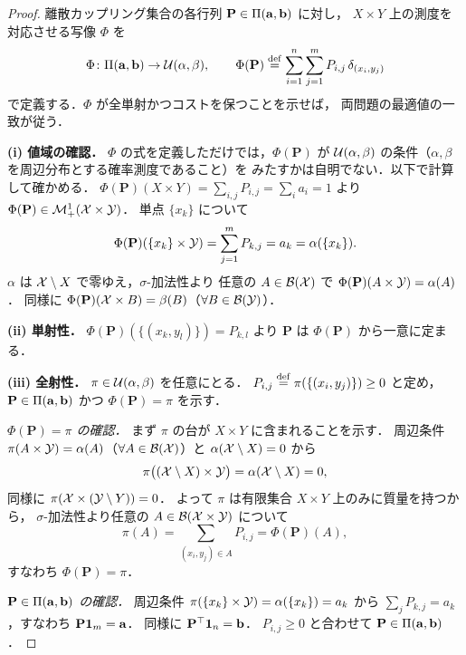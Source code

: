 \begin{proof}
  離散カップリング集合の各行列
  $\mathbf{P} \in \Pi(\mathbf{a}, \mathbf{b})$ に対し，
  $X \times Y$ 上の測度を対応させる写像 $\Phi$ を
  \[
    \Phi \colon \Pi(\mathbf{a}, \mathbf{b}) \to \mathcal{U}(\alpha, \beta),
    \qquad
    \Phi(\mathbf{P}) \overset{\mathrm{def}}{=} \sum_{i=1}^n \sum_{j=1}^m P_{i,j}\, \delta_{(x_i, y_j)}
  \]
  で定義する．$\Phi$ が全単射かつコストを保つことを示せば，
  両問題の最適値の一致が従う．

  \textbf{(i) 値域の確認．}
  $\Phi$ の式を定義しただけでは，$\Phi(\mathbf{P})$ が
  $\mathcal{U}(\alpha,\beta)$ の条件（$\alpha,\beta$ を周辺分布とする確率測度であること）を
  みたすかは自明でない．以下で計算して確かめる．
  $\Phi(\mathbf{P})(X \times Y) = \sum_{i,j} P_{i,j} = \sum_i a_i = 1$ より
  $\Phi(\mathbf{P}) \in \mathcal{M}_+^1(\mathcal{X} \times \mathcal{Y})$．
  単点 $\{x_k\}$ について
  \[
    \Phi(\mathbf{P})(\{x_k\} \times \mathcal{Y})
    = \sum_{j=1}^m P_{k,j}
    = a_k
    = \alpha(\{x_k\}).
  \]
  $\alpha$ は $\mathcal{X} \setminus X$ で零ゆえ，$\sigma$-加法性より
  任意の $A \in \mathcal{B}(\mathcal{X})$ で $\Phi(\mathbf{P})(A \times \mathcal{Y}) = \alpha(A)$．
  同様に $\Phi(\mathbf{P})(\mathcal{X} \times B) = \beta(B)$（$\forall B \in \mathcal{B}(\mathcal{Y})$）．

  \textbf{(ii) 単射性．}
  $\Phi(\mathbf{P})(\{(x_k, y_l)\}) = P_{k,l}$ より
  $\mathbf{P}$ は $\Phi(\mathbf{P})$ から一意に定まる．

  \textbf{(iii) 全射性．}
  $\pi \in \mathcal{U}(\alpha, \beta)$ を任意にとる．
  $P_{i,j} \overset{\mathrm{def}}{=} \pi(\{(x_i, y_j)\}) \geq 0$ と定め，
  $\mathbf{P} \in \Pi(\mathbf{a}, \mathbf{b})$ かつ $\Phi(\mathbf{P}) = \pi$ を示す．

  \textit{$\Phi(\mathbf{P}) = \pi$ の確認．}
  まず $\pi$ の台が $X \times Y$ に含まれることを示す．
  周辺条件 $\pi(A \times \mathcal{Y}) = \alpha(A)$（$\forall A \in \mathcal{B}(\mathcal{X})$）と
  $\alpha(\mathcal{X} \setminus X) = 0$ から
  \[
    \pi\bigl((\mathcal{X} \setminus X) \times \mathcal{Y}\bigr) = \alpha(\mathcal{X} \setminus X) = 0,
  \]
  同様に $\pi(\mathcal{X} \times (\mathcal{Y} \setminus Y)) = 0$．
  よって $\pi$ は有限集合 $X \times Y$ 上のみに質量を持つから，
  $\sigma$-加法性より任意の $A \in \mathcal{B}(\mathcal{X} \times \mathcal{Y})$ について
  \[
    \pi(A) = \sum_{(x_i,y_j) \in A} P_{i,j} = \Phi(\mathbf{P})(A),
  \]
  すなわち $\Phi(\mathbf{P}) = \pi$．

  \textit{$\mathbf{P} \in \Pi(\mathbf{a}, \mathbf{b})$ の確認．}
  周辺条件 $\pi(\{x_k\} \times \mathcal{Y}) = \alpha(\{x_k\}) = a_k$ から
  $\sum_j P_{k,j} = a_k$，すなわち $\mathbf{P}\mathbf{1}_m = \mathbf{a}$．
  同様に $\mathbf{P}^\top \mathbf{1}_n = \mathbf{b}$．
  $P_{i,j} \geq 0$ と合わせて $\mathbf{P} \in \Pi(\mathbf{a}, \mathbf{b})$．


\end{proof}
